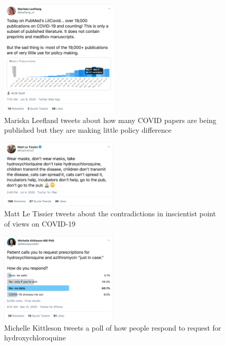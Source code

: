 \documentclass[acmsmall,authordraft]{acmart}
\begin{document}
\begin{figure}
  \includegraphics[width=0.5\textwidth]{Pictures/Appendix_Tweets/mariska leefland tweet.png}
  \caption{Mariska Leefland tweets about how many COVID papers are being published but they are making little policy difference}
  \label{mariska_leefland_tweet}
\end{figure}

\begin{figure}
  \includegraphics[width=0.5\textwidth]{Pictures/Appendix_Tweets/matt le tissier tweet.png}
  \caption{Matt Le Tissier tweets about the contradictions in inscientist point of views on COVID-19}
  \label{matt_le_tissier_tweet}
\end{figure}

\begin{figure}
  \includegraphics[width=0.5\textwidth]{Pictures/Appendix_Tweets/michelle kittleson tweet.png}
  \caption{Michelle Kittleson tweets a poll of how people respond to request for hydroxychloroquine}
  \label{michelle_kittleson_tweet}
\end{figure}
\end{document}
